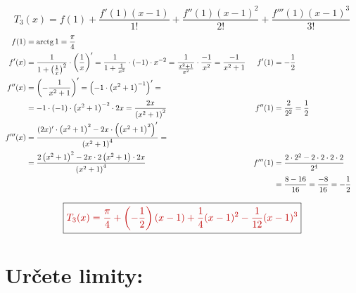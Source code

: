 \documentclass[11pt,a4paper]{article}
\newcommand{\vysl}[1]{\boxed{\color{red!75!black}#1}}
\DeclareMathOperator{\arctg}{arctg}
\newcommand{\tm}[2]{\tikz[remember picture, baseline=(#1.base)]\node[inner sep=0pt, outer sep=1pt] (#1) {$\displaystyle #2$};}
\newcommand{\mk}[1]{\tikz[remember picture, overlay]\coordinate (#1) at (0,0.25em);}
\newcommand{\hsip}[2]{\draw[sip, red!75!black] ([xshift=6pt]#1) -- ([xshift=-5pt]#2.west |- #1);}
\begin{document}
\[
T_3(x) = f(1)+\frac{f'(1)(x-1)}{1!}+\frac{f''(1)(x-1)^2}{2!}+\frac{f'''(1)(x-1)^3}{3!}
\]
\begin{align*}
f(1) &= \arctg1 = \frac\pi4\\
f'(x) &= \frac{1}{1+\left(\frac1x\right)^2}\cdot\left(\frac1x\right)' = \frac{1}{1+\frac{1}{x^2}}\cdot(-1)\cdot x^{-2}
= \frac{1}{\frac{x^2+1}{x^2}}\cdot\frac{-1}{x^2} = \frac{-1}{x^2+1}\mk{b1} & \tm{w1}{f'(1)} &= -\frac12\\
f''(x) &= \left(-\frac{1}{x^2+1}\right)' = \left(-1\cdot\left(x^2+1\right)^{-1}\right)' =\\
&= -1\cdot(-1)\cdot\left(x^2+1\right)^{-2}\cdot2x = \frac{2x}{\left(x^2+1\right)^2}\mk{b2} & \tm{w2}{f''(1)} &= \frac{2}{2^2} = \frac12\\
f'''(x) &= \frac{(2x)'\cdot\left(x^2+1\right)^2-2x\cdot\left(\left(x^2+1\right)^2\right)'}{\left(x^2+1\right)^4} =\\
&= \frac{2\left(x^2+1\right)^2-2x\cdot2\left(x^2+1\right)\cdot2x}{\left(x^2+1\right)^4}\mk{b3}
& \tm{w3}{f'''(1)} &= \frac{2\cdot2^2-2\cdot2\cdot2\cdot2}{2^4}\\
&&&= \frac{8-16}{16} = \frac{-8}{16} = -\frac12
\end{align*}
\[
\vysl{T_3(x) = \frac\pi4+\left(-\frac12\right)(x-1)+\tm{q1}{\frac14}(x-1)^2-\tm{q2}{\frac1{12}}(x-1)^3}
\]
\vspace{2.2cm}

\newpage
\section*{Určete limity:}
\end{document}
